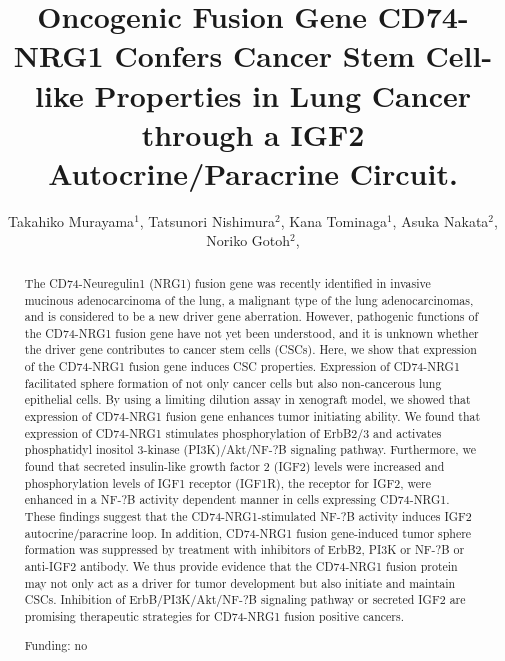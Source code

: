 \documentclass[twoside]{article}
\title{\vspace{-15mm}\fontsize{24pt}{10pt}\selectfont\textbf{ Oncogenic Fusion Gene CD74-NRG1 Confers Cancer Stem Cell-like Properties in Lung Cancer through a IGF2 Autocrine/Paracrine Circuit. }} %
\author{ Takahiko Murayama$^{1}$, Tatsunori Nishimura$^{2}$, Kana Tominaga$^{1}$, Asuka Nakata$^{2}$, Noriko Gotoh$^{2}$, }
\affil{ 1 The University of Tokyo

2 Kanazawa University

 }
\date{}
\begin{document}
  
  
  \maketitle %
  
  
  \thispagestyle{fancy} %
  
  
  \begin{abstract}
  The CD74-Neuregulin1 (NRG1) fusion gene was recently identified in invasive mucinous adenocarcinoma of the lung, a malignant type of the lung adenocarcinomas, and is considered to be a new driver gene aberration. However, pathogenic functions of the CD74-NRG1 fusion gene have not yet been understood, and it is unknown whether the driver gene contributes to cancer stem cells (CSCs). Here, we show that expression of the CD74-NRG1 fusion gene induces CSC properties. Expression of CD74-NRG1 facilitated sphere formation of not only cancer cells but also non-cancerous lung epithelial cells. By using a limiting dilution assay in xenograft model, we showed that expression of CD74-NRG1 fusion gene enhances tumor initiating ability. We found that expression of CD74-NRG1 stimulates phosphorylation of ErbB2/3 and activates phosphatidyl inositol 3-kinase (PI3K)/Akt/NF-?B signaling pathway. Furthermore, we found that secreted insulin-like growth factor 2 (IGF2) levels were increased and phosphorylation levels of IGF1 receptor (IGF1R), the receptor for IGF2, were enhanced in a NF-?B activity dependent manner in cells expressing CD74-NRG1. These findings suggest that the CD74-NRG1-stimulated NF-?B activity induces IGF2 autocrine/paracrine loop. In addition, CD74-NRG1 fusion gene-induced tumor sphere formation was suppressed by treatment with inhibitors of ErbB2, PI3K or NF-?B or anti-IGF2 antibody. We thus provide evidence that the CD74-NRG1 fusion protein may not only act as a driver for tumor development but also initiate and maintain CSCs. Inhibition of ErbB/PI3K/Akt/NF-?B signaling pathway or secreted IGF2 are promising therapeutic strategies for CD74-NRG1 fusion positive cancers.
  
  Funding: no \\ 
  \end{abstract}
  
\end{document}
